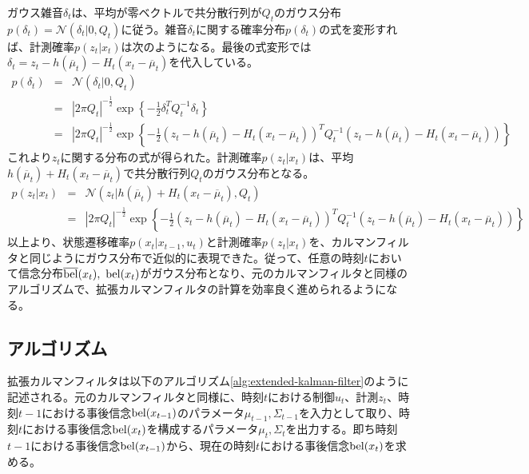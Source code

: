 \documentclass[dvipdfmx,a4paper]{jsarticle}
\begin{document}
ガウス雑音$\delta_t$は、平均が零ベクトルで共分散行列が$Q_t$のガウス分布$p(\delta_t) = \mathcal{N}(\delta_t | 0, Q_t)$に従う。雑音$\delta_t$に関する確率分布$p(\delta_t)$の式を変形すれば、計測確率$p(z_t | x_t)$は次のようになる。最後の式変形では$\delta_t = z_t - h(\overline{\mu}_t) - H_t \left( x_t - \overline{\mu}_t \right)$を代入している。
\begin{eqnarray}
	p(\delta_t) &=& \mathcal{N}(\delta_t | 0, Q_t) \nonumber \\
	&=& \left| 2 \pi Q_t \right|^{-\frac{1}{2}} \exp \left\{ -\frac{1}{2} \delta_t^T Q_t^{-1} \delta_t \right\} \\
	&=& \left| 2 \pi Q_t \right|^{-\frac{1}{2}} \exp \left\{ -\frac{1}{2} \left( z_t - h(\overline{\mu}_t) - H_t \left( x_t - \overline{\mu}_t \right) \right)^T Q_t^{-1} \left( z_t - h(\overline{\mu}_t) - H_t \left( x_t - \overline{\mu}_t \right) \right) \right\}
\end{eqnarray}
これより$z_t$に関する分布の式が得られた。計測確率$p(z_t | x_t)$は、平均$h(\overline{\mu}_t) + H_t \left( x_t - \overline{\mu}_t \right)$で共分散行列$Q_t$のガウス分布となる。
\begin{eqnarray}
	p(z_t | x_t) &=& \mathcal{N}(z_t | h(\overline{\mu}_t) + H_t \left( x_t - \overline{\mu}_t \right), Q_t) \\
	&=& \left| 2 \pi Q_t \right|^{-\frac{1}{2}} \exp \left\{ -\frac{1}{2} \left( z_t - h(\overline{\mu}_t) - H_t \left( x_t - \overline{\mu}_t \right) \right)^T Q_t^{-1} \left( z_t - h(\overline{\mu}_t) - H_t \left( x_t - \overline{\mu}_t \right) \right) \right\}
\end{eqnarray}
以上より、状態遷移確率$p(x_t | x_{t - 1}, u_t)$と計測確率$p(z_t | x_t)$を、カルマンフィルタと同じようにガウス分布で近似的に表現できた。従って、任意の時刻$t$において信念分布$\belp(x_t), \ \bel(x_t)$がガウス分布となり、元のカルマンフィルタと同様のアルゴリズムで、拡張カルマンフィルタの計算を効率良く進められるようになる。

\subsection{アルゴリズム}
拡張カルマンフィルタは以下のアルゴリズム\ref{alg:extended-kalman-filter}のように記述される。元のカルマンフィルタと同様に、時刻$t$における制御$u_t$、計測$z_t$、時刻$t - 1$における事後信念$\operatorname{bel}(x_{t - 1})$のパラメータ$\mu_{t - 1}, \Sigma_{t - 1}$を入力として取り、時刻$t$における事後信念$\operatorname{bel}(x_t)$を構成するパラメータ$\mu_t, \Sigma_t$を出力する。即ち時刻$t - 1$における事後信念$\operatorname{bel}(x_{t - 1})$から、現在の時刻$t$における事後信念$\operatorname{bel}(x_t)$を求める。
\end{document}
